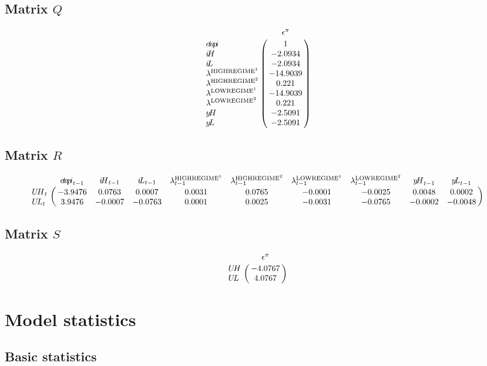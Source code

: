 \subsection*{Matrix $Q$}

$$\bordermatrix{
~ & \epsilon^{\pi} \cr
{e\!t\!a\!p\!i} & 1 \cr
{i\!H} & -2.0934 \cr
{i\!L} & -2.0934 \cr
\lambda^{\mathrm{HIGHREGIME}^{\mathrm{1}}} & -14.9039 \cr
\lambda^{\mathrm{HIGHREGIME}^{\mathrm{2}}} & 0.221 \cr
\lambda^{\mathrm{LOWREGIME}^{\mathrm{1}}} & -14.9039 \cr
\lambda^{\mathrm{LOWREGIME}^{\mathrm{2}}} & 0.221 \cr
{y\!H} & -2.5091 \cr
{y\!L} & -2.5091 \cr
}$$

\subsection*{Matrix $R$}

$$\bordermatrix{
~ & {e\!t\!a\!p\!i}_{t-1} & {i\!H}_{t-1} & {i\!L}_{t-1} & \lambda^{\mathrm{HIGHREGIME}^{\mathrm{1}}}_{t-1} & \lambda^{\mathrm{HIGHREGIME}^{\mathrm{2}}}_{t-1} & \lambda^{\mathrm{LOWREGIME}^{\mathrm{1}}}_{t-1} & \lambda^{\mathrm{LOWREGIME}^{\mathrm{2}}}_{t-1} & {y\!H}_{t-1} & {y\!L}_{t-1} \cr
{U\!H}_{t} & -3.9476 & 0.0763 & 0.0007 & 0.0031 & 0.0765 & -0.0001 & -0.0025 & 0.0048 & 0.0002 \cr
{U\!L}_{t} & 3.9476 & -0.0007 & -0.0763 & 0.0001 & 0.0025 & -0.0031 & -0.0765 & -0.0002 & -0.0048 \cr
}$$

\subsection*{Matrix $S$}

$$\bordermatrix{
~ & \epsilon^{\pi} \cr
{U\!H} & -4.0767 \cr
{U\!L} & 4.0767 \cr
}$$


\section{Model statistics}

\subsection{Basic statistics}

